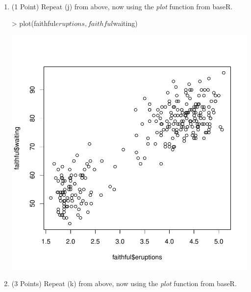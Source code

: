 \documentclass[12pt,letterpaper,final]{article}
\begin{document}
\begin{enumerate}
\begin{enumerate}
\item (1 Point) Repeat (j) from above, now using the {\it plot} function from baseR.

\begin{Schunk}
\begin{Sinput}
> plot(faithful$eruptions, faithful$waiting)
\end{Sinput}
\end{Schunk}
\includegraphics{rnw_example-012}





\item (3 Points) Repeat (k) from above, now using the {\it plot} function from baseR.


\end{enumerate}
\end{enumerate}
\end{document}
